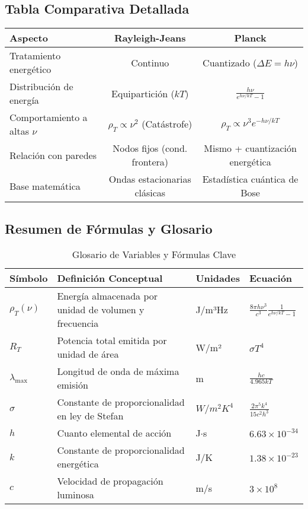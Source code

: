 \documentclass{article}
\begin{document}
	\subsection{Tabla Comparativa Detallada}
	\begin{table}[H]
		\centering
		\begin{tabular}{p{4cm}cc}
			\toprule
			\textbf{Aspecto} & \textbf{Rayleigh-Jeans} & \textbf{Planck} \\
			\midrule
			Tratamiento energético & Continuo & Cuantizado (\(\Delta E = h\nu\)) \\
			Distribución de energía & Equipartición (\(kT\)) & \(\frac{h\nu}{e^{h\nu/kT} - 1}\) \\
			Comportamiento a altas \(\nu\) & \(\rho_T \propto \nu^2\) (Catástrofe) & \(\rho_T \propto \nu^3 e^{-h\nu/kT}\) \\
			Relación con paredes & Nodos fijos (cond. frontera) & Mismo + cuantización energética \\
			Base matemática & Ondas estacionarias clásicas & Estadística cuántica de Bose \\
			\bottomrule
		\end{tabular}
	\end{table}
	
	\subsection{Resumen de Fórmulas y Glosario}
	\begin{table}[H]
		\centering
		\caption{Glosario de Variables y Fórmulas Clave}
		\begin{tabular}{llll}
			\toprule
			\textbf{Símbolo} & \textbf{Definición Conceptual} & \textbf{Unidades} & \textbf{Ecuación} \\
			\midrule
			\(\rho_T(\nu)\) & Energía almacenada por unidad de volumen y frecuencia & J/m³Hz & \(\frac{8\pi h\nu^3}{c^3}\frac{1}{e^{h\nu/kT} - 1}\) \\
			\(R_T\) & Potencia total emitida por unidad de área & W/m² & \(\sigma T^4\) \\
			\(\lambda_{\text{max}}\) & Longitud de onda de máxima emisión & m & \(\frac{hc}{4.965kT}\) \\
			\(\sigma\) & Constante de proporcionalidad en ley de Stefan & $W/m^2K^4$ & \(\frac{2\pi^5 k^4}{15c^2h^3}\) \\
			\(h\) & Cuanto elemental de acción & J$\cdot$s & \(6.63 \times 10^{-34}\) \\
			\(k\) & Constante de proporcionalidad energética & J/K & \(1.38 \times 10^{-23}\) \\
			\(c\) & Velocidad de propagación luminosa & m/s & \(3 \times 10^8\) \\
			\bottomrule
		\end{tabular}
	\end{table}
	
\end{document}

